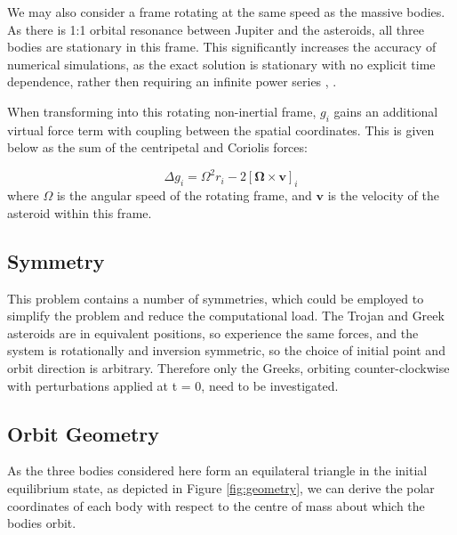 \documentclass[11pt, a4paper,twocolumn]{article} %
\begin{document}
We may also consider a frame rotating at the same speed as the massive bodies. As there is 1:1 orbital resonance between Jupiter and the asteroids, all three bodies are stationary in this frame. This significantly increases the accuracy of numerical simulations, as the exact solution is stationary with no explicit time dependence, rather then requiring an infinite power series \cite{Guglielmi2001}, \cite{LeVeque2007}.

When transforming into this rotating non-inertial frame, $g_{i}$ gains an additional virtual force term with coupling between the spatial coordinates. This is given below as the sum of the centripetal and Coriolis forces:

\begin{equation}
\Delta g_{i} = \Omega^{2} r_{i} - 2[\bm{\Omega} \times \textbf{v}]_{i}
\end{equation}
where $\Omega$ is the angular speed of the rotating frame, and $\textbf{v}$ is the velocity of the asteroid within this frame. 


\subsection{Symmetry}
This problem contains a number of symmetries, which could be employed to simplify the problem and reduce the computational load. The Trojan and Greek asteroids are in equivalent positions, so experience the same forces, and the system is rotationally and inversion symmetric, so the choice of initial point and orbit direction is arbitrary. Therefore only the Greeks, orbiting counter-clockwise with perturbations applied at t = 0, need to be investigated.

\subsection{Orbit Geometry}
As the three bodies considered here form an equilateral triangle in the initial equilibrium state, as depicted in Figure \ref{fig:geometry}, we can derive the polar coordinates of each body with respect to the centre of mass about which the bodies orbit.
\end{document}
